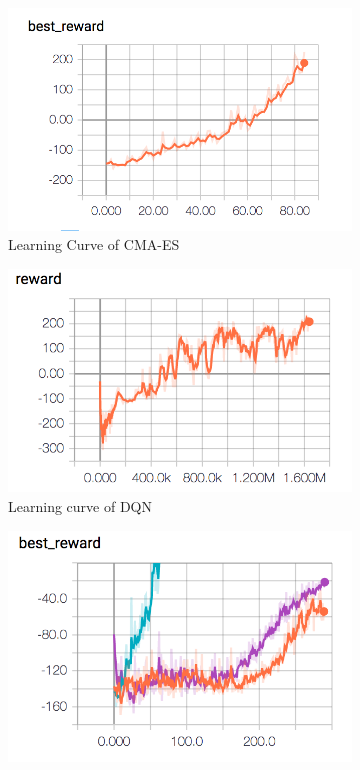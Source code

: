 \documentclass[a4paper]{article}
\begin{document}
\begin{figure}[H]
\centering
\begin{subfigure}{.3\textwidth}
  \includegraphics[width=\linewidth]{figures/cma-es-lunarlander.png}
  \caption{Learning Curve of CMA-ES}
  \label{fig:learning-curve-cma-es-lunarlander}
\end{subfigure}
\begin{subfigure}{.3\textwidth}
  \includegraphics[width=\linewidth]{figures/dqn-lunarlander.png}
  \caption{Learning curve of DQN}
  \label{fig:learning-curve-dqn-lunearlander}
\end{subfigure}
\begin{subfigure}{.3\textwidth}
	\includegraphics[width=\linewidth]{figures/ES-lunarlander.png}

\end{subfigure}
\end{figure}
\end{document}
